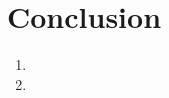 \documentclass[a4paper, 11pt]{article} %
\begin{document}

\section*{Conclusion}


\begin{enumerate}
\item 
\item 
\end{enumerate}








\end{document}
